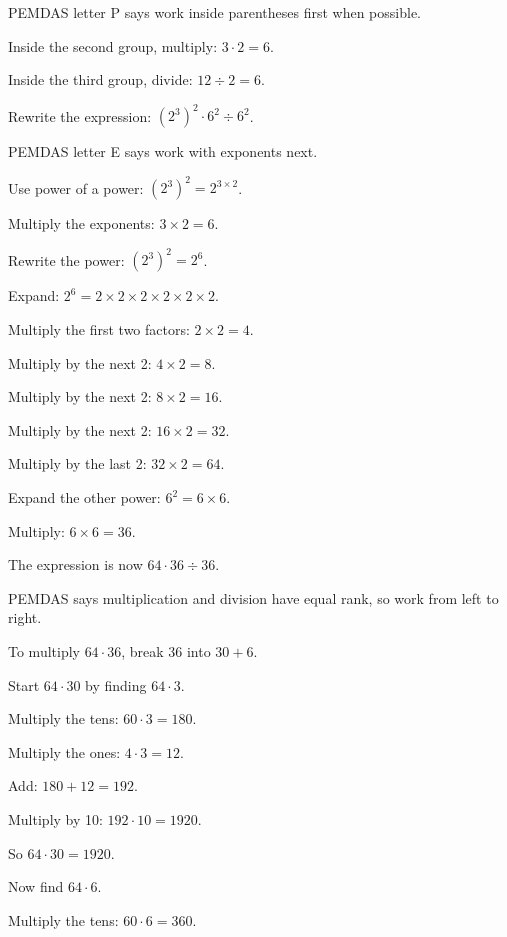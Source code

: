 \begin{steps}
  \item PEMDAS letter P says work inside parentheses first when possible.
  \item Inside the second group, multiply: $3 \cdot 2 = 6$.
  \item Inside the third group, divide: $12 \div 2 = 6$.
  \item Rewrite the expression: $(2^{3})^{2} \cdot 6^{2} \div 6^{2}$.
  \item PEMDAS letter E says work with exponents next.
  \item Use power of a power: $(2^{3})^{2} = 2^{3 \times 2}$.
  \item Multiply the exponents: $3 \times 2 = 6$.
  \item Rewrite the power: $(2^{3})^{2} = 2^{6}$.
  \item Expand: $2^{6} = 2 \times 2 \times 2 \times 2 \times 2 \times 2$.
  \item Multiply the first two factors: $2 \times 2 = 4$.
  \item Multiply by the next 2: $4 \times 2 = 8$.
  \item Multiply by the next 2: $8 \times 2 = 16$.
  \item Multiply by the next 2: $16 \times 2 = 32$.
  \item Multiply by the last 2: $32 \times 2 = 64$.
  \item Expand the other power: $6^{2} = 6 \times 6$.
  \item Multiply: $6 \times 6 = 36$.
  \item The expression is now $64 \cdot 36 \div 36$.
  \item PEMDAS says multiplication and division have equal rank, so work from
    left to right.
  \item To multiply $64 \cdot 36$, break 36 into $30 + 6$.
  \item Start $64 \cdot 30$ by finding $64 \cdot 3$.
  \item Multiply the tens: $60 \cdot 3 = 180$.
  \item Multiply the ones: $4 \cdot 3 = 12$.
  \item Add: $180 + 12 = 192$.
  \item Multiply by 10: $192 \cdot 10 = 1920$.
  \item So $64 \cdot 30 = 1920$.
  \item Now find $64 \cdot 6$.
  \item Multiply the tens: $60 \cdot 6 = 360$.

\end{steps}
